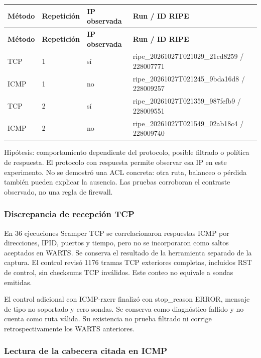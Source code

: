 \begingroup
\fontsize{9}{11}\selectfont
\addtocounter{table}{-1}
\begin{longtable}{p{1.5cm}p{1.8cm}p{2.2cm}p{8.7cm}}
\toprule
\textbf{Método} & \textbf{Repetición} & \textbf{IP observada} & \textbf{Run / ID RIPE} \\ \midrule
\endfirsthead
\toprule
\textbf{Método} & \textbf{Repetición} & \textbf{IP observada} & \textbf{Run / ID RIPE} \\ \midrule
\endhead
TCP & 1 & sí & ripe\_\allowbreak{}20261027T021029\_\allowbreak{}21cd8259 / 228007771 \\
ICMP & 1 & no & ripe\_\allowbreak{}20261027T021245\_\allowbreak{}9bda16d8 / 228009257 \\
TCP & 2 & sí & ripe\_\allowbreak{}20261027T021359\_\allowbreak{}987fefb9 / 228009551 \\
ICMP & 2 & no & ripe\_\allowbreak{}20261027T021549\_\allowbreak{}02ab18c4 / 228009740 \\
\bottomrule
\end{longtable}
\endgroup
Hipótesis: comportamiento dependiente del protocolo, posible filtrado o política de respuesta. El protocolo con respuesta permite observar esa IP en este experimento. No se demostró una ACL concreta: otra ruta, balanceo o pérdida también pueden explicar la ausencia. Las pruebas corroboran el contraste observado, no una regla de firewall.

\subsubsection{Discrepancia de recepción TCP}
En 36 ejecuciones Scamper TCP se correlacionaron respuestas ICMP por direcciones, IPID, puertos y tiempo, pero no se incorporaron como saltos aceptados en WARTS. Se conserva el resultado de la herramienta separado de la captura. El control revisó 1176 tramas TCP exteriores completas, incluidos RST de control, sin checksums TCP inválidos. Este conteo no equivale a sondas emitidas.

El control adicional con ICMP-rxerr finalizó con stop\_\allowbreak{}reason ERROR, mensaje de tipo no soportado y cero sondas. Se conserva como diagnóstico fallido y no cuenta como ruta válida. Su existencia no prueba filtrado ni corrige retrospectivamente los WARTS anteriores.

\subsubsection{Lectura de la cabecera citada en ICMP}

